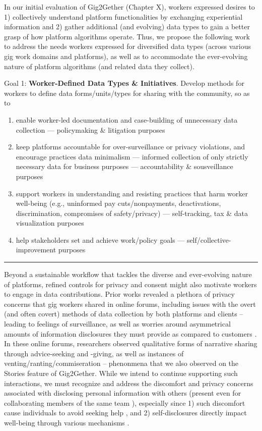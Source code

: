 In our initial evaluation of Gig2Gether (Chapter X), workers expressed desires to 1) collectively understand platform functionalities by exchanging experiential information and 
2) gather additional (and evolving) data types to gain a better grasp of how platform algorithms operate. Thus, we propose the following work to address the needs workers expressed for diversified data types (across various gig work domains and platforms), as well as to accommodate the ever-evolving nature of platform algorithms (and related data they collect).

Goal 1: \textbf{Worker-Defined Data Types \& Initiatives}. Develop methods for workers to define data forms/units/types for sharing with the community, so as to 
\begin{enumerate}
    \item enable worker-led documentation and case-building of unnecessary data collection --- policymaking \& litigation purposes
    \item keep platforms accountable for over-surveillance or privacy violations, and encourage practices data minimalism --- informed collection of only strictly necessary data for business purposes --- accountability \& sousveillance purposes
    \item support workers in understanding and resisting practices that harm worker well-being (e.g., uninformed pay cuts/nonpayments, deactivations, discrimination, compromises of safety/privacy) --- self-tracking, tax \& data visualization purposes
    \item help stakeholders set and achieve work/policy goals --- self/collective-improvement purposes
\end{enumerate}
\rule{\linewidth}{0.5mm}

Beyond a sustainable workflow that tackles the diverse and ever-evolving nature of platforms, refined controls for privacy and consent might also motivate workers to engage in data contributions. Prior works revealed a plethora of privacy concerns that gig workers shared in online forums, including issues with the overt (and often covert) methods of data collection by both platforms and clients -- leading to feelings of surveillance, as well as worries around asymmetrical amounts of information disclosures they must provide as compared to customers \cite{privacy}. In these online forums, researchers observed qualitative forms of narrative sharing through advice-seeking and -giving, as well as  instances of venting/ranting/commiseration \cite{privacy, peersupport} -- phenonmena that we also observed on the Stories feature of Gig2Gether. While we intend to continue supporting such interactions, we must recognize and address the discomfort and privacy concerns associated with disclosing personal information with others (present even for collaborating members of the same team \cite{toshare}), especially since 1) such discomfort cause individuals to avoid seeking help \cite{avoidance}, and 2) self-disclosures directly impact well-being through various mechanisms \cite{disclosurewell, psychological}.

